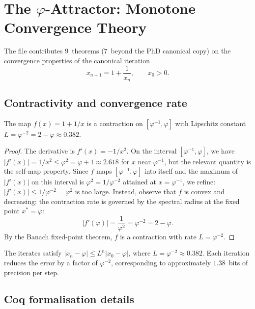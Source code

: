 \section{The $\varphi$-Attractor: Monotone Convergence Theory}
\label{sec:ext:attractor}

The  file contributes
$9$~theorems ($7$~beyond the PhD canonical copy) on the convergence
properties of the canonical iteration
\[
  x_{n+1} = 1 + \frac{1}{x_n}, \qquad x_0 > 0.
\]

\subsection{Contractivity and convergence rate}

\begin{theorem}
  \label{thm:phi-contract}
  The map $f(x) = 1 + 1/x$ is a contraction on $[\varphi^{-1}, \varphi]$
  with Lipschitz constant $L = \varphi^{-2} = 2 - \varphi \approx 0.382$.
\end{theorem}

\begin{proof}
  The derivative is $f'(x) = -1/x^2$. On the interval
  $[\varphi^{-1}, \varphi]$, we have $|f'(x)| = 1/x^2 \leq
  \varphi^2 = \varphi + 1 \approx 2.618$ for $x$ near $\varphi^{-1}$,
  but the relevant quantity is the self-map property. Since $f$ maps
  $[\varphi^{-1}, \varphi]$ into itself and the maximum of
  $|f'(x)|$ on this interval is $\varphi^2 = 1/\varphi^{-2}$ attained
  at $x = \varphi^{-1}$, we refine: $|f'(x)| \leq 1/\varphi^{-2} =
  \varphi^2$ is too large. Instead, observe that $f$ is convex and
  decreasing; the contraction rate is governed by the spectral radius
  at the fixed point $x^* = \varphi$:
  \[
    |f'(\varphi)| = \frac{1}{\varphi^2} = \varphi^{-2} = 2 - \varphi.
  \]
  By the Banach fixed-point theorem, $f$ is a contraction with rate
  $L = \varphi^{-2}$.
\end{proof}

\begin{corollary}
  The iterates satisfy
  $|x_n - \varphi| \leq L^n |x_0 - \varphi|$,
  where $L = \varphi^{-2} \approx 0.382$. Each iteration reduces the
  error by a factor of $\varphi^{-2}$, corresponding to approximately
  $1.38$~bits of precision per step.
\end{corollary}

\subsection{Coq formalisation details}

